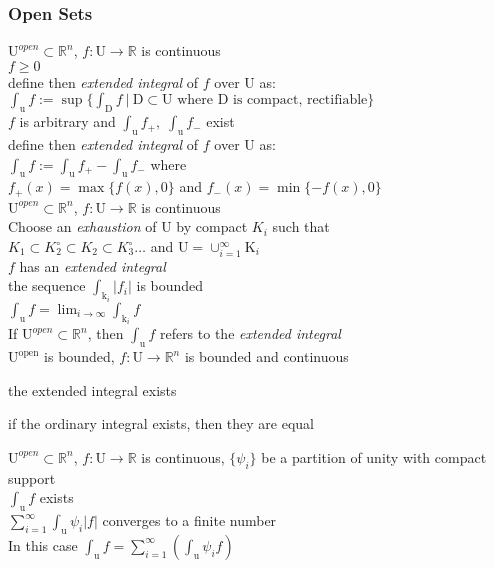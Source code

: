 \subsubsection{Open Sets}
\label{defn:extended integral}
\LET $\mathrm{U}^{open}\subset\mathbb{R}^n$,
$f:\mathrm{U}\to\mathbb{R}$ is continuous\\
\IF $f\geq 0$\\
\THEN define then \textit{extended integral} of $f$ over U as:\\
$\int_{\mathrm{u}}f := \sup\{\int_{\mathrm{D}}f\:|\:
\mathrm{D}\subset\mathrm{U}\text{ where } \mathrm{D}\text{ is compact, rectifiable} \}$\\
\IF $f$ is arbitrary and
 $\int_{\mathrm{u}}f_+,\;\int_{\mathrm{u}}f_-$ exist\\
\THEN define then \textit{extended integral} of $f$ over U as:\\
$\int_{\mathrm{u}}f:=\int_{\mathrm{u}}f_+-\int_{\mathrm{u}}f_-$ where\\
$f_+(x)=\max\{f(x),0\}$ and $f_-(x)=\min\{-f(x), 0\}$\\

\label{thm:mnk 15.2}
\LET $\mathrm{U}^{open}\subset\mathbb{R}^n$,
$f:\mathrm{U}\to\mathbb{R}$ is continuous\\
Choose an \textit{exhaustion} of U by compact $K_i$ such that\\
$K_1\subset K_2^{\circ}\subset K_2\subset K_3^{\circ}\ldots$ and 
$\mathrm{U}=\cup_{i=1}^{\infty}\mathrm{K}_i$\\
$f$ has an \textit{extended integral}\\
\IFF the sequence $\int_{\mathrm{k}_i}|f_i|$ is bounded\\
\THEN $\int_{\mathrm{u}}f=\lim_{i\to\infty}\int_{\mathrm{k}_i}f$\\

\RMK
If $\mathrm{U}^{open}\subset\mathbb{R}^n$, then $\int_{\mathrm{u}}f$ refers to the
\textit{extended integral}\\

\LET
 $\mathrm{U^{open}}$ is bounded,
$f:\mathrm{U}\to\mathbb{R}^n $ is bounded and continuous\\
\THEN
\begin{myenumerate}
\item the extended integral exists
\item if the ordinary integral exists, then they are equal
\end{myenumerate}

\label{thm:mnk 16.5}
\LET
$\mathrm{U}^{open}\subset\mathbb{R}^n$,
$f:\mathrm{U}\to\mathbb{R}$ is continuous,
$\{\psi_i\}$ be a partition of unity with compact support\\
\THEN $\int_{\mathrm{u}}f$ exists\\
\IFF $\sum_{i=1}^{\infty}\int_{\mathrm{u}}\psi_i|f|$ converges to a finite number\\
In this case $\int_{\mathrm{u}}f =\sum\limits_{i=1}^
\infty(\int_{\mathrm{u}}\psi_i f)$\\